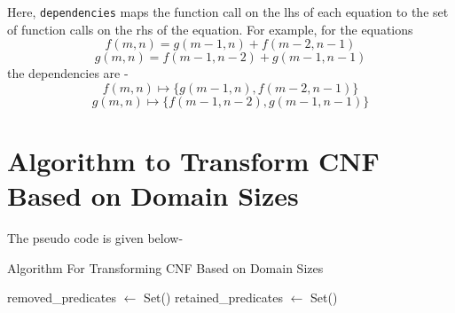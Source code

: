 \documentclass[12pt]{report}
\begin{document}
    Here, \texttt{dependencies} maps the function call on the lhs of each equation to the set of function calls on the rhs of the equation. For example, for the equations 
    \begin{equation*}
        f(m, n) = g(m-1, n) + f(m-2, n-1) 
    \end{equation*}
    \begin{equation*}
        g(m, n) = f(m-1, n-2) + g(m-1, n-1)
    \end{equation*}
    the dependencies are -
    \begin{equation*}
        f(m,n) \mapsto \{g(m-1,n), f(m-2, n-1)\}
    \end{equation*}
    \begin{equation*}
        g(m, n) \mapsto \{f(m-1, n-2), g(m-1, n-1)\}
    \end{equation*}

    \section*{Algorithm to Transform CNF Based on Domain Sizes}

    The pseudo code is given below-
    \begin{algorithm}
        \SetAlgoLined
        \caption{Algorithm For Transforming CNF Based on Domain Sizes}
        removed\_predicates $\leftarrow$ Set()
        retained\_predicates $\leftarrow$ Set()
    \end{algorithm}
\end{document}

